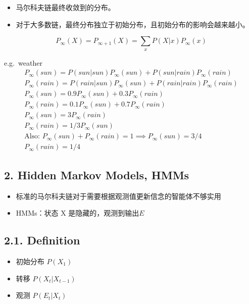 \documentclass[11pt,a4paper]{article}
\providecommand{\tightlist}{\setlength{\itemsep}{0pt}\setlength{\parskip}{0pt}}
\begin{document}
\begin{itemize}
\tightlist
\item
  马尔科夫链最终收敛到的分布。
\item
  对于大多数链，最终分布独立于初始分布，且初始分布的影响会越来越小。
\end{itemize}

\[
P_{\infty}(X) = P_{\infty+1}(X) = \sum_{x} P(X|x)P_{\infty}(x)
\]

e.g.~weather \[
\begin{aligned}
P_{\infty}(sun) = P(sun|sun)P_{\infty}(sun) + P(sun|rain)P_{\infty}(rain) \\
P_{\infty}(rain) = P(rain|sun)P_{\infty}(sun) + P(rain|rain)P_{\infty}(rain) \\
P_{\infty}(sun) = 0.9P_{\infty}(sun) + 0.3P_{\infty}(rain) \\
P_{\infty}(rain) = 0.1P_{\infty}(sun) + 0.7P_{\infty}(rain) \\
P_{\infty}(sun) = 3P_{\infty}(rain) \\
P_{\infty}(rain) = 1/3P_{\infty}(sun) \\
\text{Also: } P_{\infty}(sun) + P_{\infty}(rain) = 1 \implies P_{\infty}(sun) = 3/4 \\
P_{\infty}(rain) = 1/4
\end{aligned}
\]

\subsection{2. Hidden Markov Models, HMMs}\label{hidden-markov-models-hmms}

\begin{itemize}
\tightlist
\item
  标准的马尔科夫链对于需要根据观测值更新信念的智能体不够实用
\item
  HMMs：状态 X 是隐藏的，观测到输出\(E\)
\end{itemize}

\subsection{2.1. Definition}\label{definition}

\begin{itemize}
\tightlist
\item
  初始分布 \(P(X_1)\)
\item
  转移 \(P(X_t|X_{t-1})\)
\item
  观测 \(P(E_t|X_t)\)
\end{itemize}
\end{document}
